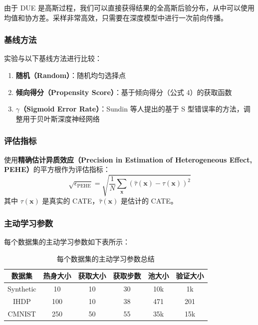 \documentclass[12pt]{article}
\begin{document}
由于 DUE 是高斯过程，我们可以直接获得结果的全高斯后验分布，从中可以使用均值和协方差。采样非常高效，只需要在深度模型中进行一次前向传播。

\subsubsection{基线方法}

实验与以下基线方法进行比较：
\begin{enumerate}
\item \textbf{随机（Random）}：随机均匀选择点
\item \textbf{倾向得分（Propensity Score）}：基于倾向得分（公式 4）的获取函数
\item \textbf{$\gamma$（Sigmoid Error Rate）}：Sundin 等人提出的基于 S 型错误率的方法，调整用于贝叶斯深度神经网络
\end{enumerate}

\subsubsection{评估指标}

使用\textbf{精确估计异质效应（Precision in Estimation of Heterogeneous Effect, PEHE）}的平方根作为评估指标：
\begin{equation}
\sqrt{\epsilon_{\text{PEHE}}} = \sqrt{\frac{1}{N}\sum_{\mathbf{x}} (\hat{\tau}(\mathbf{x}) - \tau(\mathbf{x}))^2}
\end{equation}
其中 $\tau(\mathbf{x})$ 是真实的 CATE，$\hat{\tau}(\mathbf{x})$ 是估计的 CATE。

\subsubsection{主动学习参数}

每个数据集的主动学习参数如下表所示：

\begin{table}[h]
\centering
\caption{每个数据集的主动学习参数总结}
\begin{tabular}{cccccc}
\toprule
数据集 & 热身大小 & 获取大小 & 获取步数 & 池大小 & 验证大小 \\
\midrule
Synthetic & 10 & 10 & 30 & 10k & 1k \\
IHDP & 100 & 10 & 38 & 471 & 201 \\
CMNIST & 250 & 50 & 55 & 35k & 15k \\
\bottomrule
\end{tabular}
\end{table}
\end{document}
